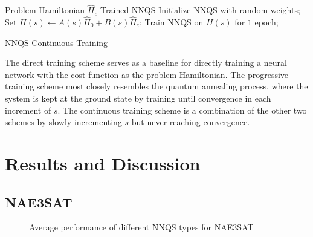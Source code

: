 \begin{algorithm}
    \begin{algorithmic}
    \Require Problem Hamiltonian $\hat{H}_c$
    \Ensure Trained NNQS
    \State Initialize NNQS with random weights;
    \State Set $H(s) \leftarrow A(s)\hat{H}_0 + B(s)\hat{H}_c$;
    \State Train NNQS on $H(s)$ for $1$ epoch;
    \EndFor
    \end{algorithmic}
    \caption{NNQS Continuous Training}
    \label{alg:continuous}
\end{algorithm}

The direct training scheme serves as a baseline for directly training a neural network with the cost function as the problem Hamiltonian. The progressive training scheme most closely resembles the quantum annealing process, where the system is kept at the ground state by training until convergence in each increment of $s$. The continuous training scheme is a combination of the other two schemes by slowly incrementing $s$ but never reaching convergence.

\section{Results and Discussion}
\subsection{NAE3SAT}

\begin{figure}[!h]
    \hfill
    \caption{Average performance of different NNQS types for NAE3SAT}
    \label{nnqs-nae3sat-average}
\end{figure}

